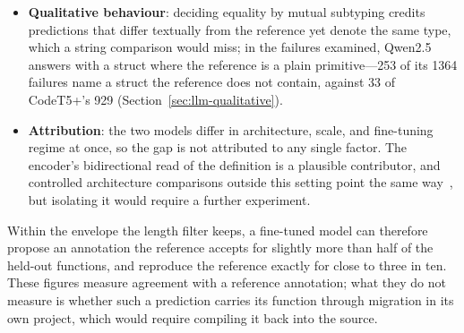 \begin{itemize}
    \item \textbf{Qualitative behaviour}: deciding equality by mutual subtyping credits predictions that differ textually from the reference yet denote the same type, which a string comparison would miss; in the failures examined, Qwen2.5 answers with a struct where the reference is a plain primitive---\num{253} of its \num{1364} failures name a struct the reference does not contain, against \num{33} of CodeT5+'s \num{929} (Section~\ref{sec:llm-qualitative}).
    \item \textbf{Attribution}: the two models differ in architecture, scale, and fine-tuning regime at once, so the gap is not attributed to any single factor. The encoder's bidirectional read of the definition is a plausible contributor, and controlled architecture comparisons outside this setting point the same way~\cite{t5,wang2022architecture}, but isolating it would require a further experiment.
\end{itemize}
Within the envelope the length filter keeps, a fine-tuned model can therefore propose an annotation the reference accepts for slightly more than half of the held-out functions, and reproduce the reference exactly for close to three in ten.
These figures measure agreement with a reference annotation; what they do not measure is whether such a prediction carries its function through migration in its own project, which would require compiling it back into the source.
